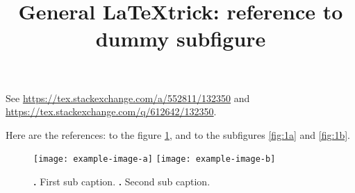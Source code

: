 \documentclass{goose-article}
\title{General \LaTeX trick: reference to dummy subfigure}
\author{}
\begin{document}
\maketitle

See \url{https://tex.stackexchange.com/a/552811/132350} and
\url{https://tex.stackexchange.com/q/612642/132350}.

Here are the references: to the figure \cref{fig:1}, and to the subfigures \cref{fig:1a} and \cref{fig:1b}.

\begin{figure}[htp]
    \centering
    \subfloat{\label{fig:1a}}
    \subfloat{\label{fig:1b}}
    \texttt{[image: example-image-a]}
    \hspace{.02\linewidth}
    \texttt{[image: example-image-b]}
    \caption{
        \textbf{\protect{}.}
        First sub caption.
        \textbf{\protect{}.}
        Second sub caption.
        \kant[8]
    }
    \label{fig:1}
\end{figure}

\kant[1-7]
\end{document}
